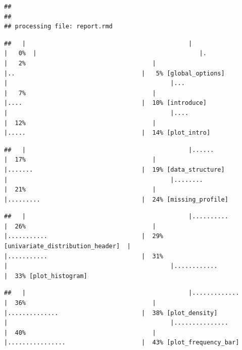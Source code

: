 \documentclass[
]{article}
\begin{document}
\begin{verbatim}
## 
## 
## processing file: report.rmd
\end{verbatim}

\begin{verbatim}
##   |                                             |                                     |   0%  |                                             |.                                    |   2%                                   |                                             |..                                   |   5% [global_options]                  |                                             |...                                  |   7%                                   |                                             |....                                 |  10% [introduce]                       |                                             |....                                 |  12%                                   |                                             |.....                                |  14% [plot_intro]
\end{verbatim}

\begin{verbatim}
##   |                                             |......                               |  17%                                   |                                             |.......                              |  19% [data_structure]                  |                                             |........                             |  21%                                   |                                             |.........                            |  24% [missing_profile]
\end{verbatim}

\begin{verbatim}
##   |                                             |..........                           |  26%                                   |                                             |...........                          |  29% [univariate_distribution_header]  |                                             |...........                          |  31%                                   |                                             |............                         |  33% [plot_histogram]
\end{verbatim}

\begin{verbatim}
##   |                                             |.............                        |  36%                                   |                                             |..............                       |  38% [plot_density]                    |                                             |...............                      |  40%                                   |                                             |................                     |  43% [plot_frequency_bar]
\end{verbatim}
\end{document}
